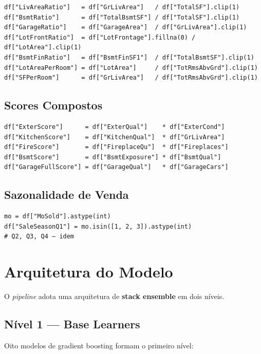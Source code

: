 \documentclass[12pt,a4paper]{article}
\begin{document}
\begin{verbatim}
df["LivAreaRatio"]   = df["GrLivArea"]   / df["TotalSF"].clip(1)
df["BsmtRatio"]      = df["TotalBsmtSF"] / df["TotalSF"].clip(1)
df["GarageRatio"]    = df["GarageArea"]  / df["GrLivArea"].clip(1)
df["LotFrontRatio"]  = df["LotFrontage"].fillna(0) / df["LotArea"].clip(1)
df["BsmtFinRatio"]   = df["BsmtFinSF1"]  / df["TotalBsmtSF"].clip(1)
df["LotAreaPerRoom"] = df["LotArea"]     / df["TotRmsAbvGrd"].clip(1)
df["SFPerRoom"]      = df["GrLivArea"]   / df["TotRmsAbvGrd"].clip(1)
\end{verbatim}
\subsection{Scores Compostos}
\label{sec:orgafdcb3b}

\begin{verbatim}
df["ExterScore"]      = df["ExterQual"]    * df["ExterCond"]
df["KitchenScore"]    = df["KitchenQual"]  * df["GrLivArea"]
df["FireScore"]       = df["FireplaceQu"]  * df["Fireplaces"]
df["BsmtScore"]       = df["BsmtExposure"] * df["BsmtQual"]
df["GarageFullScore"] = df["GarageQual"]   * df["GarageCars"]
\end{verbatim}
\subsection{Sazonalidade de Venda}
\label{sec:orgca01b0e}

\begin{verbatim}
mo = df["MoSold"].astype(int)
df["SaleSeasonQ1"] = mo.isin([1, 2, 3]).astype(int)
# Q2, Q3, Q4 — idem
\end{verbatim}
\section{Arquitetura do Modelo}
\label{sec:orgb6dca74}

O \emph{pipeline} adota uma arquitetura de \textbf{stack ensemble} em dois níveis.
\subsection{Nível 1 — Base Learners}
\label{sec:org58ef214}

Oito modelos de gradient boosting formam o primeiro nível:
\end{document}
